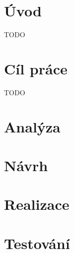 
\graphicspath{ {./images} }

\chapter*{Úvod}
\setcounter{page}{1}

TODO

\chapter{Cíl práce}

TODO

\chapter{Analýza}



\chapter{Návrh}



\chapter{Realizace}



\chapter{Testování}

